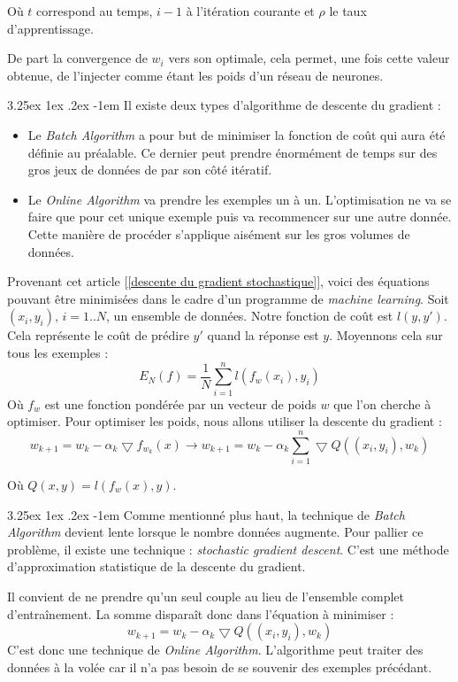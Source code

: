 \documentclass[a4paper, 11pt]{article}
\makeatletter
\renewcommand\paragraph{\@startsection{paragraph}{5}{\z@}%
  {3.25ex \@plus1ex \@minus.2ex}%
  {-1em}%
  {\normalfont\normalsize\bfseries}}
\makeatother
\begin{document}
Où $t$ correspond au temps, $i-1$ à l'itération courante et $\rho$ le taux d'apprentissage.

De part la convergence de $w_i$ vers son optimale, cela permet, une fois cette valeur obtenue, de l'injecter comme étant les poids d'un réseau de neurones.

\paragraph{}
Il existe deux types d'algorithme de descente du gradient :
\begin{itemize}
\item Le \textit{Batch Algorithm} a pour but de minimiser la fonction de coût qui aura été définie au préalable. Ce dernier peut prendre énormément de temps sur des gros jeux de données de par son côté itératif.
\item Le \textit{Online Algorithm} va prendre les exemples un à un. L'optimisation ne va se faire que pour cet unique exemple puis va recommencer sur une autre donnée. Cette manière de procéder s'applique aisément sur les gros volumes de données.
\end{itemize}

Provenant cet article [\ref{descente du gradient stochastique}], voici des équations pouvant être minimisées dans le cadre d'un programme de \textit{machine learning}.
Soit $(x_i,y_i)\text{,\ } i=1..N$, un ensemble de données. Notre fonction de coût est $l(y,y')$. Cela représente le coût de prédire $y'$ quand la réponse est $y$. Moyennons cela sur tous les exemples :
$$E_N(f) = \frac{1}{N} \sum_{i=1}^{n}l(f_w(x_i),y_i)$$
Où $f_w$ est une fonction pondérée par un vecteur de poids $w$ que l'on cherche à optimiser.
Pour optimiser les poids, nous allons utiliser la descente du gradient :
$$w_{k+1} = w_k - \alpha_k \bigtriangledown f_{w_k}(x) \rightarrow w_{k+1} = w_k -\alpha_k \sum_{i=1}^n \bigtriangledown Q ((x_i,y_i), w_k)$$

Où $Q(x,y) = l(f_w(x),y)$.

\paragraph{}
Comme mentionné plus haut, la technique de \textit{Batch Algorithm} devient lente lorsque le nombre données augmente. Pour pallier ce problème, il existe une technique : \textit{stochastic gradient descent}. C'est une méthode d'approximation statistique de la descente du gradient.

Il convient de ne prendre qu'un seul couple au lieu de l'ensemble complet d'entraînement. La somme disparaît donc dans l'équation à minimiser :
$$w_{k+1} = w_k -\alpha_k \bigtriangledown Q ((x_i,y_i), w_k)$$
C'est donc une technique de \textit{Online Algorithm}. L'algorithme peut traiter des données à la volée car il n'a pas besoin de se souvenir des exemples précédant.
\end{document}
